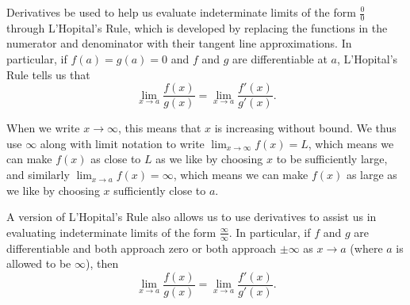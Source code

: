 \begin{summary}
\item Derivatives be used to help us evaluate indeterminate limits of the form $\frac{0}{0}$ through L'Hopital's Rule, which is developed by replacing the functions in the numerator and denominator with their tangent line approximations.  In particular, if $f(a) = g(a) = 0$ and $f$ and $g$ are differentiable at $a$, L'Hopital's Rule tells us that 
$$\lim_{x \to a}\frac{f(x)}{g(x)} = \lim_{x \to a}\frac{f'(x)}{g'(x)}.$$
\item When we write $x \to \infty$, this means that $x$ is increasing without bound.  We thus use $\infty$ along with limit notation to write $\lim_{x \to \infty} f(x) = L$, which means we can make $f(x)$ as close to $L$ as we like by choosing $x$ to be sufficiently large, and similarly $\lim_{x \to a} f(x) = \infty$, which means we can make $f(x)$ as large as we like by choosing $x$ sufficiently close to $a$.
\item A version of L'Hopital's Rule also allows us to use derivatives to assist us in evaluating indeterminate limits of the form $\frac{\infty}{\infty}$.  In particular, if $f$ and $g$ are differentiable and both approach zero or both approach $\pm \infty$ as $x \to a$ (where $a$ is allowed to be $\infty$), then
$$\lim_{x \to a} \frac{f(x)}{g(x)} = \lim_{x \to a} \frac{f'(x)}{g'(x)}.$$
\end{summary}

\clearpage

 

\cleardoublepage